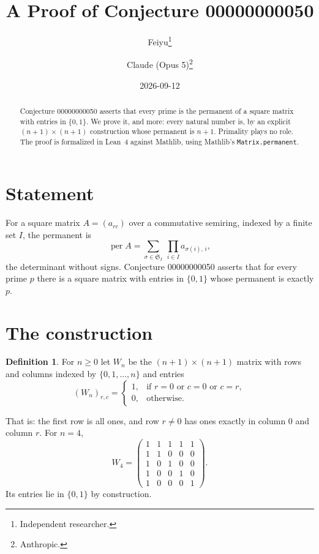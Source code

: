 \documentclass[11pt]{article}
\title{A Proof of Conjecture 00000000050}
\author{%
  Feiyu\thanks{Independent researcher.}
  \and
  Claude (Opus 5)\thanks{Anthropic.}%
}
\date{2026-09-12}
\theoremstyle{plain}
\theoremstyle{definition}
\newtheorem{definition}[theorem]{Definition}
\theoremstyle{remark}
\DeclareMathOperator{\per}{per}
\begin{document}
\maketitle

\begin{abstract}
Conjecture 00000000050 asserts that every prime is the permanent of a square
matrix with entries in $\{0,1\}$. We prove it, and more: every natural number
is, by an explicit $(n+1)\times(n+1)$ construction whose permanent is $n+1$.
Primality plays no role. The proof is formalized in Lean~4 against Mathlib,
using Mathlib's \texttt{Matrix.permanent}.
\end{abstract}

\section{Statement}

For a square matrix $A=(a_{rc})$ over a commutative semiring, indexed by a
finite set $I$, the permanent is
\[
  \per A=\sum_{\sigma\in\mathfrak S_I}\ \prod_{i\in I}a_{\sigma(i),\,i} ,
\]
the determinant without signs. Conjecture 00000000050 asserts that for every
prime $p$ there is a square matrix with entries in $\{0,1\}$ whose permanent is
exactly $p$.

\section{The construction}

\begin{definition}
For $n\ge0$ let $W_n$ be the $(n+1)\times(n+1)$ matrix with rows and columns
indexed by $\{0,1,\ldots,n\}$ and entries
\[
  (W_n)_{r,c}=
  \begin{cases}
    1,&\text{if }r=0\text{ or }c=0\text{ or }c=r,\\
    0,&\text{otherwise.}
  \end{cases}
\]
\end{definition}

That is: the first row is all ones, and row $r\ne0$ has ones exactly in
column $0$ and column $r$. For $n=4$,
\[
  W_4=
  \begin{pmatrix}
    1&1&1&1&1\\
    1&1&0&0&0\\
    1&0&1&0&0\\
    1&0&0&1&0\\
    1&0&0&0&1
  \end{pmatrix}.
\]
Its entries lie in $\{0,1\}$ by construction.
\end{document}
